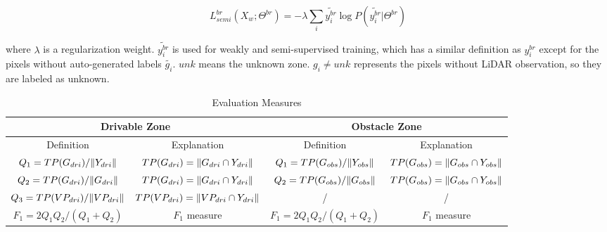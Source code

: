 \documentclass[letterpaper, 10 pt, conference]{ieeeconf}  %
\begin{document}
\vspace{-2mm}
\begin{equation}
\label{equ:loss1}
L^{br}_{semi}(X_w;\Theta^{br})=-\lambda \sum_{i}{\widetilde{y_i^{br}} \log{P(\widetilde{y_i^{br}}|\Theta^{br})}}
\end{equation}

where $\lambda$ is a regularization weight. $\widetilde{y_i^{br}}$ is used for weakly and semi-supervised training, which has a similar definition as $y_i^{br}$ except for the pixels without auto-generated labels $\widetilde{g_i}$. $unk$ means the unknown zone. $g_i\neq unk$ represents the pixels without LiDAR observation, so they are labeled as unknown.

\begin{table}
	\caption{Evaluation Measures}
	\label{tab:evaluation}
	\centering
	\renewcommand{\arraystretch}{1.5}
	\begin{tabular}{cclccl}
		\hline
		\multicolumn{3}{c|}{Drivable Zone}                                                                                                    & \multicolumn{3}{c}{Obstacle Zone}                                                                                                  \\ \hline
		Definition                                            & \multicolumn{2}{c|}{Explanation}                                               & Definition                                          & \multicolumn{2}{c}{Explanation}                                               \\ \hline
		$Q_1={TP(G_{dri})}/{\Arrowvert Y_{dri} \Arrowvert}$   & \multicolumn{2}{c|}{$TP(G_{dri})=\Arrowvert G_{dri}\cap Y_{dri} \Arrowvert$}   & $Q_1={TP(G_{obs})}/{\Arrowvert Y_{obs} \Arrowvert}$ & \multicolumn{2}{c}{$TP(G_{obs})=\Arrowvert G_{obs}\cap Y_{obs} \Arrowvert$}   \\
		$Q_2={TP(G_{dri})}/{\Arrowvert G_{dri} \Arrowvert}$   & \multicolumn{2}{c|}{$TP(G_{dri})=\Arrowvert G_{dri}\cap Y_{dri} \Arrowvert$}   & $Q_2={TP(G_{obs})}/{\Arrowvert G_{obs} \Arrowvert}$ & \multicolumn{2}{c}{$TP(G_{obs})=\Arrowvert G_{obs}\cap Y_{obs} \Arrowvert$}   \\
		$Q_3={TP(VP_{dri})}/{\Arrowvert VP_{dri} \Arrowvert}$ & \multicolumn{2}{c|}{$TP(VP_{dri})=\Arrowvert VP_{dri}\cap Y_{dri} \Arrowvert$} & /                                                   & \multicolumn{2}{c}{/}                                                         \\
		$F_1={2Q_1Q_2}/{(Q_1+Q_2)}$                           & \multicolumn{2}{c|}{$F_1$ measure}                                            & $F_1={2Q_1Q_2}/{(Q_1+Q_2)}$                         & \multicolumn{2}{c}{$F_1$ measure}                                             \\ 

\end{tabular}
\end{table}
\end{document}
